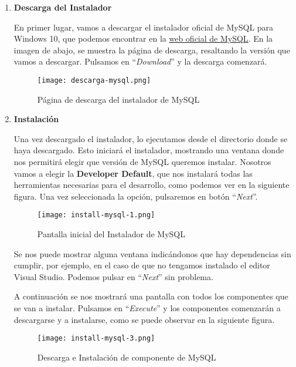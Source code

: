 \begin{enumerate}
    \item \textbf{Descarga del Instalador}

    En primer lugar, vamos a descargar el instalador oficial de MySQL para Windows 10, que podemos encontrar en la \href{https://dev.mysql.com/downloads/installer/}{web oficial de MySQL}. En la imagen de abajo, se muestra la página de descarga, resaltando la versión que vamos a descargar. Pulsamos en ``\textit{Download}'' y la descarga comenzará.

    \begin{figure}[ht]
        \centering
        \texttt{[image: descarga-mysql.png]}
        \caption{Página de descarga del instalador de MySQL}
    \end{figure}

    \item \textbf{Instalación}

    Una vez descargado el instalador, lo ejecutamos desde el directorio donde se haya descargado. Esto iniciará el instalador, mostrando una ventana donde nos permitirá elegir que versión de MySQL queremos instalar. Nosotros vamos a elegir la \textbf{Developer Default}, que nos instalará todas las herramientas necesarias para el desarrollo, como podemos ver en la siguiente figura. Una vez seleccionada la opción, pulsaremos en botón ``\textit{Next}''.

   \begin{figure}[ht]
        \centering
        \texttt{[image: install-mysql-1.png]}
        \caption{Pantalla inicial del Instalador de MySQL}
    \end{figure}

    Se nos puede mostrar alguna ventana indicándonos que hay dependencias sin cumplir, por ejemplo, en el caso de que no tengamos instalado el editor Visual Studio. Podemos pulsar en ``\textit{Next}'' sin problema.

    A continuación se nos mostrará una pantalla con todos los componentes que se van a instalar. Pulsamos en ``\textit{Execute}'' y los componentes comenzarán a descargarse y a instalarse, como se puede observar en la siguiente figura.

    \begin{figure}[ht]
        \centering
        \texttt{[image: install-mysql-3.png]}
        \caption{Descarga e Instalación de componente de MySQL}
    \end{figure}


\end{enumerate}
